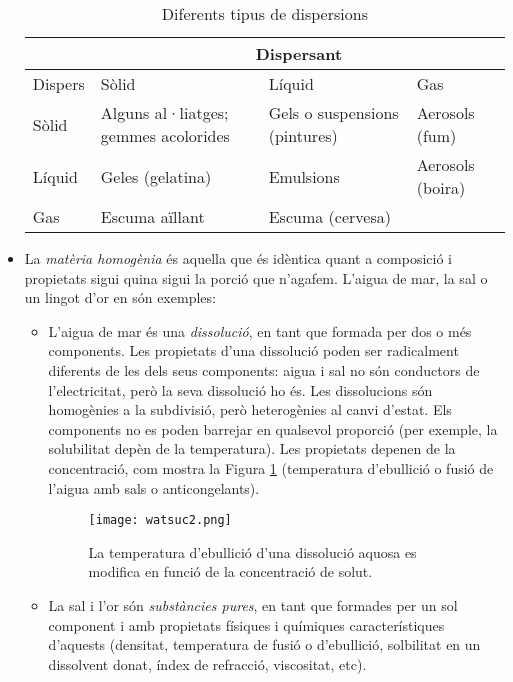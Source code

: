 \begin{itemize}
\begin{table}[h!]
	\begin{center}
		\caption{Diferents tipus de dispersions}
		\label{tab:colloid}
		\begin{tabular}{l|l|l|l}
			& \multicolumn{3}{c}{Dispersant}\\ 
			\hline
			Dispers & Sòlid & Líquid & Gas\\
			\hline
			Sòlid & Alguns al·liatges; gemmes acolorides & Gels o suspensions (pintures) & Aerosols (fum) \\
			Líquid & Geles (gelatina) & Emulsions & Aerosols (boira) \\
			Gas & Escuma aïllant & Escuma (cervesa) & \\
			\hline
		\end{tabular}
	\end{center}
\end{table}
\item La \emph{matèria homogènia} és aquella que és idèntica quant a composició i propietats sigui quina sigui la porció que n'agafem. L'aigua de mar, la sal o un lingot d'or en són exemples:
\begin{itemize}
\item L'aigua de mar és una \emph{dissolució}, en tant que formada per dos o més components. Les propietats d'una dissolució poden ser radicalment diferents de les dels seus components: aigua i sal no són conductors de l'electricitat, però la seva dissolució ho és. Les dissolucions són homogènies a la subdivisió, però heterogènies al canvi d'estat. Els components no es poden barrejar en qualsevol proporció (per exemple, la solubilitat depèn de la temperatura). Les propietats depenen de la concentració, com mostra la Figura \ref{fig:watsuc2} (temperatura d'ebullició o fusió de l'aigua amb sals o anticongelants).
\begin{figure}[h]
\centering
\texttt{[image: watsuc2.png]}
\caption{La temperatura d'ebullició d'una dissolució aquosa es modifica en funció de la concentració de solut.}
\label{fig:watsuc2}
\end{figure}
\item La sal i l'or són \emph{substàncies pures}, en tant que formades per un sol component i amb propietats físiques i químiques característiques d'aquests (densitat, temperatura de fusió o d'ebullició, solbilitat en un dissolvent donat, índex de refracció, viscositat, etc).
\end{itemize}
\end{itemize}


